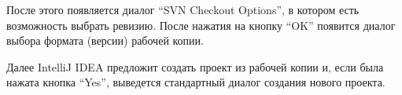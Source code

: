 \documentclass[a4paper,12pt]{article}
\begin{document}
После этого появляется диалог ``SVN Checkout Options'', в котором есть
возможность выбрать ревизию. После нажатия на кнопку ``OK'' появится диалог
выбора формата (версии) рабочей копии.

\begin{figure}[h!]
	\begin{minipage}[h]{0.49\linewidth}
	\end{minipage}
	\hfill
	\begin{minipage}[h]{0.49\linewidth}
	\end{minipage}
\end{figure}

Далее IntelliJ IDEA предложит создать проект из рабочей копии и, если была
нажата кнопка ``Yes'', выведется стандартный диалог создания нового проекта.
\end{document}
